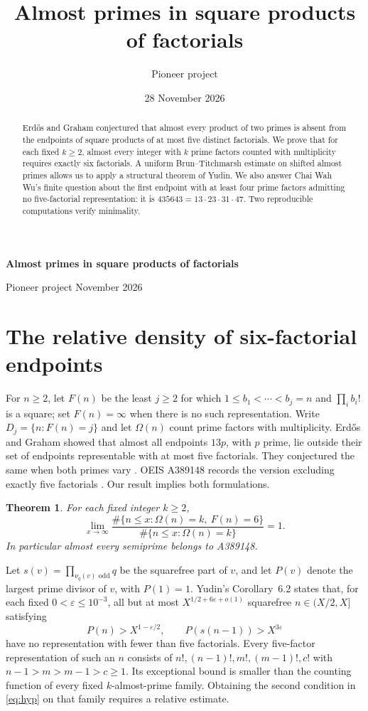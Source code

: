 \documentclass[10pt,letterpaper]{article}
\title{Almost primes in square products of factorials}
\author{Pioneer project}
\date{28 November 2026}
\newtheorem{theorem}{Theorem}
\begin{document}
\begin{center}
{\Large\bfseries Almost primes in square products of factorials}\par\smallskip
Pioneer project  November 2026
\end{center}
\begin{abstract}
Erd\H{o}s and Graham conjectured that almost every product of two primes is absent from the endpoints of square products of at most five distinct factorials. We prove that for each fixed \(k\ge2\), almost every integer with \(k\) prime factors counted with multiplicity requires exactly six factorials. A uniform Brun--Titchmarsh estimate on shifted almost primes allows us to apply a structural theorem of Yudin. We also answer Chai Wah Wu's finite question about the first endpoint with at least four prime factors admitting no five-factorial representation: it is \(435643=13\cdot23\cdot31\cdot47\). Two reproducible computations verify minimality.
\end{abstract}

\section{The relative density of six-factorial endpoints}

For \(n\ge2\), let \(F(n)\) be the least \(j\ge2\) for which
\(1\le b_1<\cdots<b_j=n\) and \(\prod_i b_i!\) is a square; set \(F(n)=\infty\) when there is no such representation. Write \(D_j=\{n:F(n)=j\}\) and let \(\Omega(n)\) count prime factors with multiplicity. Erd\H{o}s and Graham showed that almost all endpoints \(13p\), with \(p\) prime, lie outside their set of endpoints representable with at most five factorials. They conjectured the same when both primes vary \cite[Theorem~3 and p.~353]{eg}. OEIS A389148 records the version excluding exactly five factorials \cite{parent}. Our result implies both formulations.

\begin{theorem}\label{thm:almost}
For each fixed integer \(k\ge2\),
\[
\lim_{x\to\infty}
 \frac{\#\{n\le x:\Omega(n)=k,\ F(n)=6\}}
      {\#\{n\le x:\Omega(n)=k\}}=1 .
\]
In particular almost every semiprime belongs to A389148.
\end{theorem}

Let \(s(v)=\prod_{\nu_q(v)\text{ odd}}q\) be the squarefree part of \(v\), and let \(P(v)\) denote the largest prime divisor of \(v\), with \(P(1)=1\). Yudin's Corollary~6.2 \cite{yudin} states that, for each fixed \(0<\varepsilon\le10^{-3}\), all but at most \(X^{1/2+6\varepsilon+o(1)}\) squarefree \(n\in(X/2,X]\) satisfying
\[
 P(n)>X^{1-\varepsilon/2},\qquad P(s(n-1))>X^{3\varepsilon}
 \tag{1}\label{eq:hyp}
\]
have no representation with fewer than five factorials. Every five-factor representation of such an \(n\) consists of \(n!, (n-1)!,m!,(m-1)!,c!\) with \(n-1>m>m-1>c\ge1\). Its exceptional bound is smaller than the counting function of every fixed \(k\)-almost-prime family. Obtaining the second condition in \eqref{eq:hyp} on that family requires a relative estimate.
\end{document}
